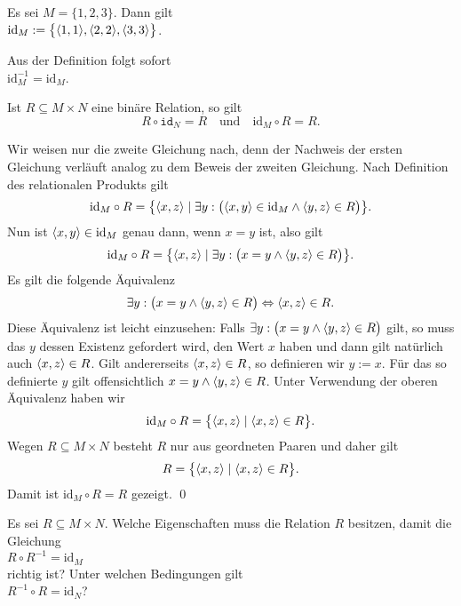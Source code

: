 \example
Es sei $M = \{1,2,3\}$.  Dann gilt \\[0.2cm]
\hspace*{1.3cm}  $\mathrm{id}_M := \bigl\{ \pair(1,1),  \pair(2,2),  \pair(3,3) \bigr\}$.  \eox
\vspace*{0.2cm}

\remark
Aus der Definition folgt sofort \\[0.2cm]
\hspace*{1.3cm} $\mathrm{id}_M^{-1} = \mathrm{id}_M$. \eox

\begin{Satz}
  Ist $R \subseteq M \times N$  eine bin\"{a}re Relation, so gilt 
  \[ R \circ \mathtt{id}_N = R \quad \mbox{und} \quad \mathrm{id}_M \circ R = R. \] 
\end{Satz}

\proof
Wir weisen nur die zweite Gleichung nach, denn der Nachweis der ersten Gleichung verl\"{a}uft analog zu
dem Beweis der zweiten Gleichung.  Nach Definition des relationalen Produkts
gilt
\[ \mathrm{id}_M \circ R = \bigl\{ \pair(x,z) \mid \exists y:\bigl(\pair(x,y) \in \mathrm{id}_M \wedge \pair(y,z) \in R \bigr)\bigr\}. \]
Nun ist $\pair(x,y) \in \mathrm{id}_M$ genau dann, wenn $x = y$ ist, also gilt
\[ \mathrm{id}_M \circ R = \bigl\{ \pair(x,z) \mid \exists y:\bigl( x = y \wedge \pair(y,z) \in R\bigr) \bigr\}. \]
Es gilt die folgende \"{A}quivalenz
\[ \exists y:\bigl(x = y \wedge \pair(y,z) \in R \bigr) \Leftrightarrow \pair(x,z) \in R. \]
Diese \"{A}quivalenz ist leicht einzusehen:  Falls $\exists y:\bigl( x = y \wedge \pair(y,z) \in R\bigr)$
gilt, so muss das $y$ dessen Existenz gefordert wird, den Wert $x$ haben und dann gilt
nat\"{u}rlich auch $\pair(x,z) \in R$.  Gilt andererseits $\pair(x,z) \in R$, so definieren
wir $y := x$.  F\"{u}r das so definierte $y$ gilt offensichtlich 
$x = y \wedge \pair(y,z) \in R$.  Unter Verwendung der oberen \"{A}quivalenz haben wir 
\[ \mathrm{id}_M \circ R = \bigl\{ \pair(x,z) \mid \pair(x,z) \in R \bigr\}. \]
Wegen  $R \subseteq M \times N$ besteht $R$ nur aus geordneten
Paaren und daher gilt
\[ R = \bigl\{ \pair(x,z) \mid \pair(x,z) \in R \bigr\}. \]
Damit ist $\mathrm{id}_M \circ R = R$ gezeigt. \qed
\pagebreak

\exercise
Es sei $R \subseteq M \times N$.  Welche Eigenschaften muss die Relation $R$ besitzen, damit die Gleichung 
\\[0.2cm]
\hspace*{1.3cm}
$R \circ R^{-1} = \mathrm{id}_M$ 
\\[0.2cm]
richtig ist? Unter welchen Bedingungen gilt
\\[0.2cm]
\hspace*{1.3cm}
$R^{-1} \circ R = \mathrm{id}_N$?
\eox


